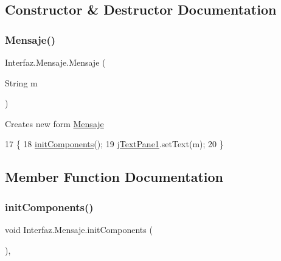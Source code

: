 \subsection{Constructor \& Destructor Documentation}
\mbox{\label{class_interfaz_1_1_mensaje_a2206473aa776a341267e31c9c132c733}} 
\subsubsection{\texorpdfstring{Mensaje()}{Mensaje()}}
{\footnotesize\ttfamily Interfaz.\+Mensaje.\+Mensaje (\begin{DoxyParamCaption}\item[{String}]{m }\end{DoxyParamCaption})\hspace{0.3cm}{\ttfamily [inline]}}

Creates new form \mbox{\hyperlink{class_interfaz_1_1_mensaje}{Mensaje}} 
\begin{DoxyCode}
17                              \{
18         \mbox{\hyperlink{class_interfaz_1_1_mensaje_a1d01f1253c5cce9770a855f6cd81915b}{initComponents}}();
19         \mbox{\hyperlink{class_interfaz_1_1_mensaje_abbd0afdc912a7465ded350b063ae1a4e}{jTextPane1}}.setText(m);
20     \}
\end{DoxyCode}


\subsection{Member Function Documentation}
\mbox{\label{class_interfaz_1_1_mensaje_a1d01f1253c5cce9770a855f6cd81915b}} 
\subsubsection{\texorpdfstring{init\+Components()}{initComponents()}}
{\footnotesize\ttfamily void Interfaz.\+Mensaje.\+init\+Components (\begin{DoxyParamCaption}{ }\end{DoxyParamCaption})\hspace{0.3cm}{\ttfamily [inline]}, {\ttfamily [private]}}

